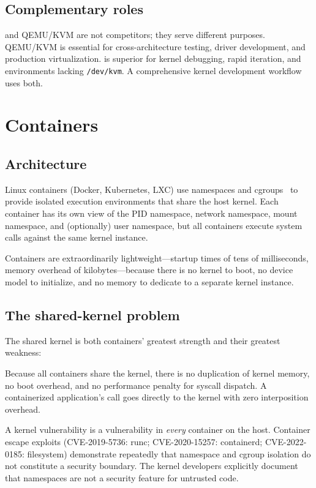 \subsection{Complementary roles}

\UML{} and QEMU/KVM are not competitors; they serve different
purposes.  QEMU/KVM is essential for cross-architecture testing,
driver development, and production virtualization.  \UML{} is
superior for kernel debugging, rapid iteration, and environments
lacking \texttt{/dev/kvm}.  A comprehensive kernel development
workflow uses both.


\section{Containers}
\label{sec:related-containers}

\subsection{Architecture}

Linux containers (Docker, Kubernetes, LXC) use namespaces and
cgroups~\cite{soltesz2007,namespaces,cgroups-v2} to provide
isolated execution environments that share the host kernel.  Each
container has its own view of the PID namespace, network namespace,
mount namespace, and (optionally) user namespace, but all containers
execute system calls against the same kernel instance.

Containers are extraordinarily lightweight---startup times of tens
of milliseconds, memory overhead of kilobytes---because there is
no kernel to boot, no device model to initialize, and no memory
to dedicate to a separate kernel instance.

\subsection{The shared-kernel problem}

The shared kernel is both containers' greatest strength and their
greatest weakness:

\begin{description}[style=nextline,leftmargin=2em]
  \item[Strength.]
    Because all containers share the kernel, there is no duplication
    of kernel memory, no boot overhead, and no performance penalty for
    syscall dispatch.  A containerized application's 
    call goes directly to the kernel with zero interposition overhead.

  \item[Weakness.]
    A kernel vulnerability is a vulnerability in \emph{every}
    container on the host.  Container escape exploits
    (CVE-2019-5736: runc; CVE-2020-15257: containerd; CVE-2022-0185:
    filesystem) demonstrate repeatedly that namespace and cgroup
    isolation do not constitute a security boundary.  The kernel
    developers explicitly document that namespaces are not a
    security feature for untrusted code.
\end{description}

